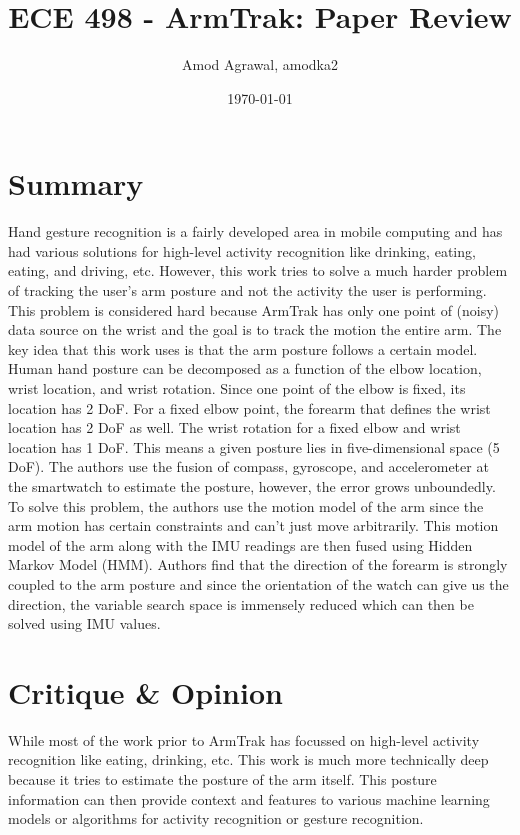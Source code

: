 \documentclass[a4paper]{article}
\title{ECE 498 - ArmTrak: Paper Review}
\author{Amod Agrawal, amodka2}
\date{\today}
\begin{document}
\maketitle
\section{Summary}
Hand gesture recognition is a fairly developed area in mobile computing and has had various solutions for high-level activity recognition like drinking, eating, eating, and driving, etc. However, this work tries to solve a much harder problem of tracking the user's arm posture and not the activity the user is performing. This problem is considered hard because ArmTrak has only one point of (noisy) data source on the wrist and the goal is to track the motion the entire arm. The key idea that this work uses is that the arm posture follows a certain model.\\

Human hand posture can be decomposed as a function of the elbow location, wrist location, and wrist rotation. Since one point of the elbow is fixed, its location has 2 DoF. For a fixed elbow point, the forearm that defines the wrist location has 2 DoF as well. The wrist rotation for a fixed elbow and wrist location has 1 DoF. This means a given posture lies in five-dimensional space (5 DoF). The authors use the fusion of compass, gyroscope, and accelerometer at the smartwatch to estimate the posture, however, the error grows unboundedly. To solve this problem, the authors use the motion model of the arm since the arm motion has certain constraints and can't just move arbitrarily. This motion model of the arm along with the IMU readings are then fused using Hidden Markov Model (HMM). Authors find that the direction of the forearm is strongly coupled to the arm posture and since the orientation of the watch can give us the direction, the variable search space is immensely reduced which can then be solved using IMU values. 


\section{Critique \& Opinion}
While most of the work prior to ArmTrak has focussed on high-level activity recognition like eating, drinking, etc. This work is much more technically deep because it tries to estimate the posture of the arm itself. This posture information can then provide context and features to various machine learning models or algorithms for activity recognition or gesture recognition.\\
\end{document}
